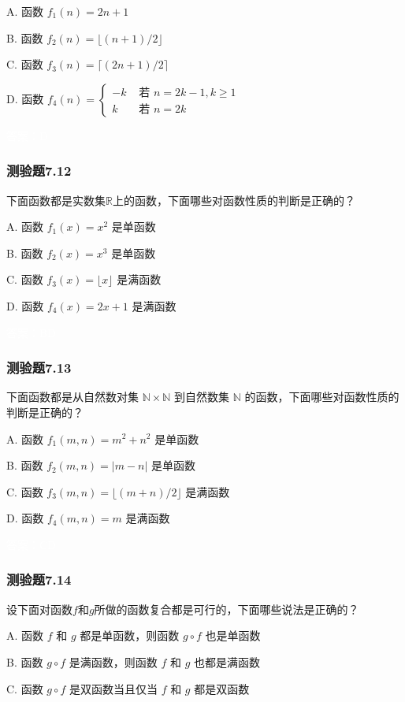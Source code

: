 \documentclass[UTF8, heading=true]{ctexart}
\begin{document}
A. 函数 $f_1(n)=2 n+1$

B. 函数 $f_2(n)=\lfloor(n+1) / 2\rfloor$

C. 函数 $f_3(n)=\lceil(2 n+1) / 2\rceil$

D. 函数 $f_4(n)= \begin{cases}-k & \text { 若 } n=2 k-1, k \geq 1 \\ k & \text { 若 } n=2 k\end{cases}$

\textcolor{white}{答案：D}

\subsubsection{测验题7.12}

下面函数都是实数集$\mathbb{R}$上的函数，下面哪些对函数性质的判断是正确的？

A. 函数 $f_1(x)=x^2$ 是单函数

B. 函数 $f_2(x)=x^3$ 是单函数

C. 函数 $f_3(x)=\lfloor x\rfloor$ 是满函数

D. 函数 $f_4(x)=2 x+1$ 是满函数

\textcolor{white}{答案：BD}

\subsubsection{测验题7.13}

下面函数都是从自然数对集 $\mathbb{N} \times \mathbb{N}$ 到自然数集 $\mathbb{N}$ 的函数，下面哪些对函数性质的判断是正确的？

A. 函数 $f_1(m, n)=m^2+n^2$ 是单函数

B. 函数 $f_2(m, n)=|m-n|$ 是单函数

C. 函数 $f_3(m, n)=\lfloor(m+n) / 2\rfloor$ 是满函数

D. 函数 $f_4(m, n)=m$ 是满函数

\textcolor{white}{答案：CD}

\subsubsection{测验题7.14}

设下面对函数$f$和$g$所做的函数复合都是可行的，下面哪些说法是正确的？

A. 函数 $f$ 和 $g$ 都是单函数，则函数 $g \circ f$ 也是单函数

B. 函数 $g \circ f$ 是满函数，则函数 $f$ 和 $g$ 也都是满函数

C. 函数 $g \circ f$ 是双函数当且仅当 $f$ 和 $g$ 都是双函数
\end{document}
